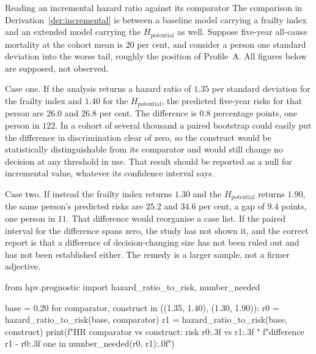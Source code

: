 \begin{workedexample}{Reading an incremental hazard ratio against its comparator}
The comparison in Derivation~\ref{der:incremental} is between a baseline model
carrying a frailty index and an extended model carrying the
$H_{\text{potential}}$ as well. Suppose five-year all-cause mortality at the
cohort mean is $20$ per cent, and consider a person one standard deviation into
the worse tail, roughly the position of Profile~A. All figures below are
supposed, not observed.

Case one. If the analysis returns a hazard ratio of $1.35$ per standard
deviation for the frailty index and $1.40$ for the $H_{\text{potential}}$, the
predicted five-year risks for that person are $26.0$ and $26.8$ per cent. The
difference is $0.8$ percentage points, one person in $122$. In a cohort of
several thousand a paired bootstrap could easily put the difference in
discrimination clear of zero, so the construct would be statistically
distinguishable from its comparator and would still change no decision at any
threshold in use. That result should be reported as a null for
incremental value, whatever its confidence interval says.

Case two. If instead the frailty index returns $1.30$ and the
$H_{\text{potential}}$ returns $1.90$, the same person's predicted risks are
$25.2$ and $34.6$ per cent, a gap of $9.4$ points, one person in $11$. That
difference would reorganise a case list. If the paired interval for the
difference spans zero, the study has not shown it, and the correct report is
that a difference of decision-changing size has not been ruled out and has not
been established either. The remedy is a larger sample, not a firmer adjective.

\begin{wecode}[Python]
from hpv.prognostic import hazard_ratio_to_risk, number_needed

base = 0.20
for comparator, construct in ((1.35, 1.40), (1.30, 1.90)):
    r0 = hazard_ratio_to_risk(base, comparator)
    r1 = hazard_ratio_to_risk(base, construct)
    print(f"HR {comparator} vs {construct}: risk {r0:.3f} vs {r1:.3f}  "
          f"difference {r1 - r0:.3f}  one in {number_needed(r0, r1):.0f}")
\end{wecode}

\end{workedexample}

